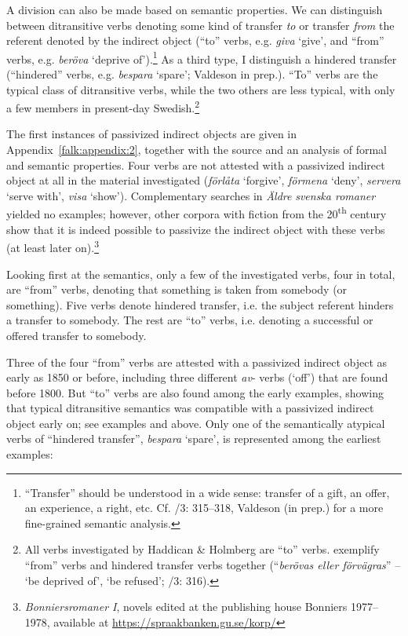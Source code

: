\documentclass[output=paper]{langscibook}
\begin{document}
A division can also be made based on semantic properties. We can distinguish between ditransitive verbs denoting some kind of transfer \textit{to} or transfer \textit{from} the referent denoted by the indirect object (“to” verbs, e.g. \textit{giva} ‘give’, and “from” verbs, e.g. \textit{beröva} ‘deprive of’).\footnote{“Transfer” should be understood in a wide sense: transfer of a gift, an offer, an experience, a right, etc. Cf. \citealt{TelemanEtAl1999}/3: 315–318, Valdeson (in prep.) for a more fine-grained semantic analysis.} As a third type, I distinguish a hindered transfer (“hindered” verbs, e.g. \textit{bespara} ‘spare’; Valdeson in prep.). “To” verbs are the typical class of ditransitive verbs, while the two others are less typical, with only a few members in present-day Swedish.\footnote{All verbs investigated by Haddican \& Holmberg are “to” verbs. \citet{TelemanEtAl1999} exemplify “from” verbs and hindered transfer verbs together (“\textit{berövas eller förvägras}” – ‘be deprived of’, ‘be refused’; \citealt{TelemanEtAl1999}/3: 316).} 



The first instances of passivized indirect objects are given in Appendix~\ref{falk:appendix:2}, together with the source and an analysis of formal and semantic properties. Four verbs are not attested with a passivized indirect object at all in the material investigated (\textit{förlåta} ‘forgive’, \textit{förmena} ‘deny’, \textit{servera} ‘serve with’, \textit{visa} ‘show’). Complementary searches in \textit{Äldre} \textit{svenska romaner} yielded no examples; however, other corpora with fiction from the 20\textsuperscript{th} century show that it is indeed possible to passivize the indirect object with these verbs (at least later on).\footnote{\textit{Bonniersromaner I}, novels edited at the publishing house Bonniers 1977–1978, available at \url{https://spraakbanken.gu.se/korp/}} 



Looking first at the semantics, only a few of the investigated verbs, four in total, are “from” verbs, denoting that something is taken from somebody (or something). Five verbs denote hindered transfer, i.e. the subject referent hinders a transfer to somebody. The rest are “to” verbs, i.e. denoting a successful or offered transfer to somebody. 



Three of the four “from” verbs are attested with a passivized indirect object as early as 1850 or before, including three different \textit{av}{}- verbs (‘off’) that are found before 1800. But “to” verbs are also found among the early examples, showing that typical ditransitive semantics was compatible with a passivized indirect object early on; see examples  and  above. Only one of the semantically atypical verbs of “hindered transfer”, \textit{bespara} ‘spare’, is represented among the earliest examples:
\end{document}
